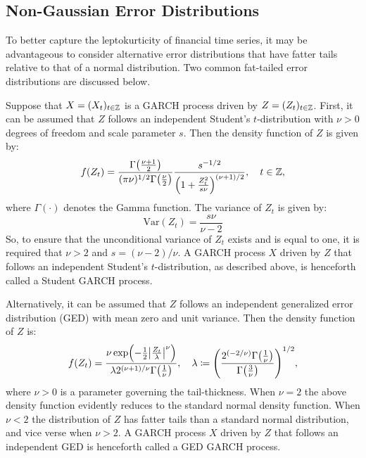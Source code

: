 \subsection{Non-Gaussian Error Distributions}\label{ss:ng}
To better capture the leptokurticity of financial time series, it may be advantageous to consider alternative error distributions that have fatter tails relative to that of a normal distribution. Two common fat-tailed error distributions are discussed below.

Suppose that $X=(X_{t})_{t\in\mathbb{Z}}$ is a GARCH process driven by $Z=(Z_{t})_{t\in\mathbb{Z}}$. First, it can be assumed that $Z$ follows an independent Student's $t$-distribution with $\nu>0$ degrees of freedom and scale parameter $s$. Then the density function of $Z$ is given by:
\begin{equation*}
    f(Z_{t})=\frac{\Gamma\left(\frac{\nu+1}{2}\right)}{(\pi\nu)^{1/2}\Gamma\left(\frac{\nu}{2}\right)}\frac{s^{-1/2}}{\left(1+\frac{Z_{t}^{2}}{s\nu}\right)^{(\nu+1)/2}},\quad t\in \Z,
\end{equation*}
where $\Gamma(\cdot)$ denotes the Gamma function. The variance of $Z_{t}$ is given by:
\begin{equation*}
    \mathrm{Var}(Z_{t})=\frac{s\nu}{\nu-2}
\end{equation*}
So, to ensure that the unconditional variance of $Z_{t}$ exists and is equal to one, it is required that $\nu>2$ and $s=(\nu-2)/\nu$. A GARCH process $X$ driven by $Z$ that follows an independent Student's $t$-distribution, as described above, is henceforth called a Student GARCH process.

Alternatively, it can be assumed that $Z$ follows an independent generalized error distribution (GED) with mean zero and unit variance. Then the density function of $Z$ is:
\begin{equation*}
    f(Z_{t})=\frac{\nu\exp\left(-\frac{1}{2}\absscale{\frac{Z_{t}}{\lambda}}^{\nu}\right)}{\lambda 2^{(\nu+1)/\nu}\Gamma\left(\frac{1}{\nu}\right)},\quad \lambda\coloneqq\left(\frac{2^{(-2/\nu)}\Gamma\left(\frac{1}{\nu}\right)}{\Gamma\left(\frac{3}{\nu}\right)}\right)^{1/2},
\end{equation*}
where $\nu>0$ is a parameter governing the tail-thickness. When $\nu=2$ the above density function evidently reduces to the standard normal density function. When $\nu<2$ the distribution of $Z$ has fatter tails than a standard normal distribution, and vice verse when $\nu>2$.
A GARCH process $X$ driven by $Z$ that follows an independent GED is henceforth called a GED GARCH process. 

